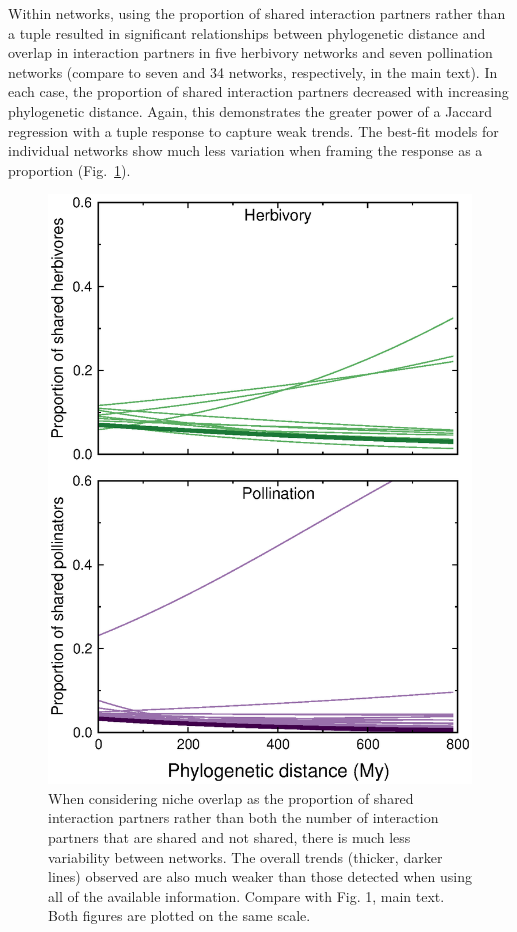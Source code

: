 \documentclass[12pt]{article}
\begin{document}
\begin{spacing}{1.5}
    Within networks, using the proportion of shared interaction partners rather than a tuple resulted in significant relationships between phylogenetic distance and overlap in interaction partners in five herbivory networks and seven pollination networks (compare to seven and 34 networks, respectively, in the main text). In each case, the proportion of shared interaction partners decreased with increasing phylogenetic distance. Again, this demonstrates the greater power of a Jaccard regression with a tuple response to capture weak trends. The best-fit models for individual networks show much less variation when framing the response as a proportion (Fig.~\ref{lineplot}).


    \begin{figure}[!h]
        \begin{center}
          \centerline{\includegraphics*[width=.75\textwidth]{Figures/dataplots/proportion_regression_lines_full_color.eps}}
        \end{center}
         \caption{\small When considering niche overlap as the proportion of shared interaction partners rather than both the number of interaction partners that are shared and not shared, there is much less variability between networks. The overall trends (thicker, darker lines) observed are also much weaker than those detected when using all of the available information. Compare with Fig. 1, main text. Both figures are plotted on the same scale.
         }
        \label{lineplot}
      \end{figure}



\end{spacing}
\end{document}
